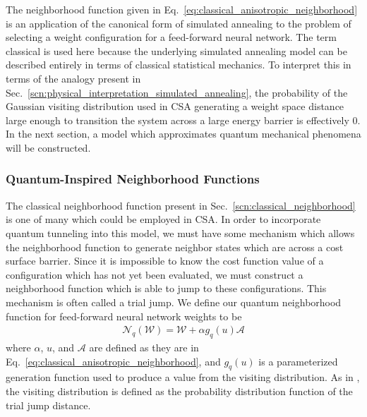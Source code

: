 \documentclass[11pt]{afthesis}
\begin{document}
	The neighborhood function given in Eq.~\ref{eq:classical_anisotropic_neighborhood} is an application of the canonical form of simulated annealing to the problem of selecting a weight configuration for a feed-forward neural network. The term classical is used here because the underlying simulated annealing model can be described entirely in terms of classical statistical mechanics. To interpret this in terms of the analogy present in Sec.~\ref{scn:physical_interpretation_simulated_annealing}, the probability of the Gaussian visiting distribution used in CSA generating a weight space distance large enough to transition the system across a large energy barrier is effectively $0$. In the next section, a model which approximates quantum mechanical phenomena will be constructed.
	
	\subsubsection{Quantum-Inspired Neighborhood Functions}
	\label{scn:quantum_neighborhood}
	
	The classical neighborhood function present in Sec.~\ref{scn:classical_neighborhood} is one of many which could be employed in CSA. In order to incorporate quantum tunneling into this model, we must have some mechanism which allows the neighborhood function to generate neighbor states which are across a cost surface barrier. Since it is impossible to know the cost function value of a configuration which has not yet been evaluated, we must construct a neighborhood function which is able to jump to these configurations. This mechanism is often called a trial jump. We define our quantum neighborhood function for feed-forward neural network weights to be
	\begin{align}\label{eq:quantum_anisotropic_neighborhood}
	\mathcal{N}_{q} (\boldsymbol{\mathcal{W}}) = \boldsymbol{\mathcal{W}} + \alpha g_{q}(u) \boldsymbol{\mathcal{A}} 
	\end{align}
	\noindent where $\alpha$, $u$, and $\boldsymbol{\mathcal{A}}$ are defined as they are in Eq.~\ref{eq:classical_anisotropic_neighborhood}, and $g_{q}(u)$ is a parameterized generation function used to produce a value from the visiting distribution. As in \cite{tsallis1996generalizedsimulatedannealing}, the visiting distribution is defined as the probability distribution function of the trial jump distance. 
	
\end{document}

